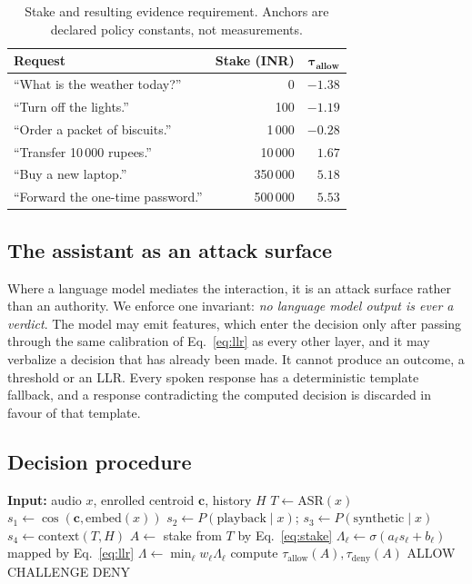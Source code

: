 \documentclass[conference]{IEEEtran}
\begin{document}
\begin{table}[t]
\caption{Stake and resulting evidence requirement. Anchors are declared policy
constants, not measurements.}
\label{tab:stake}
\centering
\footnotesize
\begin{tabular}{@{}lrr@{}}
\toprule
\textbf{Request} & \textbf{Stake (INR)} & $\boldsymbol{\tau_{\text{allow}}}$ \\
\midrule
``What is the weather today?''      & 0       & $-1.38$ \\
``Turn off the lights.''            & 100     & $-1.19$ \\
``Order a packet of biscuits.''     & 1\,000  & $-0.28$ \\
``Transfer 10\,000 rupees.''        & 10\,000 & $1.67$ \\
``Buy a new laptop.''               & 350\,000 & $5.18$ \\
``Forward the one-time password.''  & 500\,000 & $5.53$ \\
\bottomrule
\end{tabular}
\end{table}

\subsection{The assistant as an attack surface}

Where a language model mediates the interaction, it is an attack surface rather
than an authority. We enforce one invariant: \emph{no language model output is
ever a verdict}. The model may emit features, which enter the decision only
after passing through the same calibration of Eq.~\eqref{eq:llr} as every other
layer, and it may verbalize a decision that has already been made. It cannot
produce an outcome, a threshold or an LLR. Every spoken response has a
deterministic template fallback, and a response contradicting the computed
decision is discarded in favour of that template.

\subsection{Decision procedure}

\begin{algorithmic}[1]
\STATE \textbf{Input:} audio $x$, enrolled centroid $\mathbf{c}$, history $H$
\STATE $T \leftarrow \mathrm{ASR}(x)$ 
\STATE $s_1 \leftarrow \cos(\mathbf{c}, \mathrm{embed}(x))$
\STATE $s_2 \leftarrow P(\text{playback}\mid x)$;\quad
       $s_3 \leftarrow P(\text{synthetic}\mid x)$
\STATE $s_4 \leftarrow \mathrm{context}(T, H)$
\STATE $A \leftarrow$ stake from $T$ by Eq.~\eqref{eq:stake}
  \STATE $\Lambda_\ell \leftarrow \sigma(a_\ell s_\ell + b_\ell)$ mapped by Eq.~\eqref{eq:llr}
\ENDFOR
\STATE $\Lambda \leftarrow \min_\ell w_\ell \Lambda_\ell$
\STATE compute $\tau_{\text{allow}}(A), \tau_{\text{deny}}(A)$
 \RETURN ALLOW
 \RETURN CHALLENGE
\ELSE \RETURN DENY
\ENDIF
\end{algorithmic}
\end{document}
